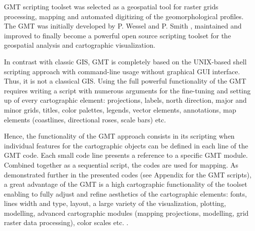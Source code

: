 \documentclass[11pt,a4paper]{report}
\begin{document}
{\ac{GMT} scripting toolset was selected as a geospatial tool for raster grids processing, mapping and automated digitizing of the geomorphological profiles. The \ac{GMT} was initially developed by P. Wessel and P. Smith \cite{Wesseletal2013}, maintained and improved to finally become a powerful open source scripting toolset for the geospatial analysis and cartographic visualization. 

In contrast with classic \ac{GIS}, \ac{GMT} is completely based on the UNIX-based shell scripting approach with command-line usage without graphical \ac{GUI} interface. Thus, it is not a classical \ac{GIS}. Using the full powerful functionality of the \ac{GMT} requires writing a script with numerous arguments for the fine-tuning and setting up of every cartographic element: projections, labels, north direction, major and minor grids, titles, color palettes, legends, vector elements, annotations, map elements (coastlines, directional roses, scale bars) etc. 

Hence, the functionality of the \ac{GMT} approach consists in its scripting when individual features for the cartographic objects can be defined in each line of the \ac{GMT} code. Each small code line presents a reference to a specific \ac{GMT} module. Combined together as a sequential script, the codes are used for mapping. As demonstrated further in the presented codes (see Appendix for the \ac{GMT} scripts), a great advantage of the \ac{GMT} is a high cartographic functionality of the toolset enabling to fully adjust and refine aesthetics of the cartographic elements: fonts, lines width and type, layout, a large variety of the visualization, plotting, modelling, advanced cartographic modules (mapping projections, modelling, grid raster data processing), color scales etc. \cite{WesselSmith1991}.  

}
\end{document}
